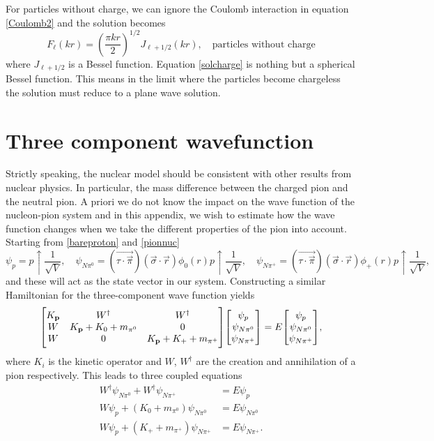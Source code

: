 For particles without charge, we can ignore the Coulomb interaction in equation \eqref{Coulomb2} and the solution becomes \cite{Blatt}
\begin{equation} \label{solcharge}
	F_\ell(kr) = \left( \frac{\pi kr}{2} \right)^{1/2} J_{\ell+1/2}(kr), \quad \text{particles without charge}
\end{equation}
where $J_{\ell+1/2}$ is a Bessel function. Equation \eqref{solcharge} is nothing but a spherical Bessel function. This means in the limit where the particles become chargeless the solution must reduce to a plane wave solution. 

\chapter{Three component wavefunction}\label{ThreeComponentWavefunction}
Strictly speaking, the nuclear model should be consistent with other results from nuclear physics. In particular, the mass difference between the charged pion and the neutral pion. A priori we do not know the impact on the wave function of the nucleon-pion system and in this appendix, we wish to estimate how the wave function changes when we take the different properties of the pion into account. Starting from \eqref{bareproton} and \eqref{pionnuc}
\begin{equation}\label{pnpipi}
	\psi_p = p\uparrow\frac{1}{\sqrt{V}}, \quad \psi_{N\pi^0}=(\vec{\tau\cdot\vec{\pi}})(\vec{\sigma}\cdot\vec{r})\phi_0(r) p\uparrow\frac{1}{\sqrt{V}}, \quad \psi_{N\pi^+}=(\vec{\tau\cdot\vec{\pi}})(\vec{\sigma}\cdot\vec{r})\phi_+(r) p\uparrow\frac{1}{\sqrt{V}},
\end{equation}
and these will act as the state vector in our system. Constructing a similar Hamiltonian for the three-component wave function yields
\begin{equation}
	\mqty[K_{\vec{p}} & W^\dagger & W^\dagger \\ W & K_{\vec{p}}+K_0+m_{\pi^0} & 0 \\ W & 0 & K_{\vec{p}}+K_{+}+m_{\pi^+}]\mqty[\psi_p \\ \psi_{N\pi^0} \\ \psi_{N\pi^+}] = E \mqty[\psi_p \\ \psi_{N\pi^0} \\ \psi_{N\pi^+}],
\end{equation}
where $K_i$ is the kinetic operator and $W$, $W^\dagger$ are the creation and annihilation of a pion respectively. This leads to three coupled equations 
\begin{align}
	W^\dagger \psi_{N\pi^0}+W^\dagger \psi_{N\pi^+} & = E\psi_p \\    
	W\psi_p + (K_0+m_{\pi^0})\psi_{N\pi^0} &=E\psi_{N\pi^0} \\
	W\psi_p + (K_{+}+m_{\pi^+})\psi_{N\pi^+}  & =E\psi_{N\pi^+}. 
\end{align}
